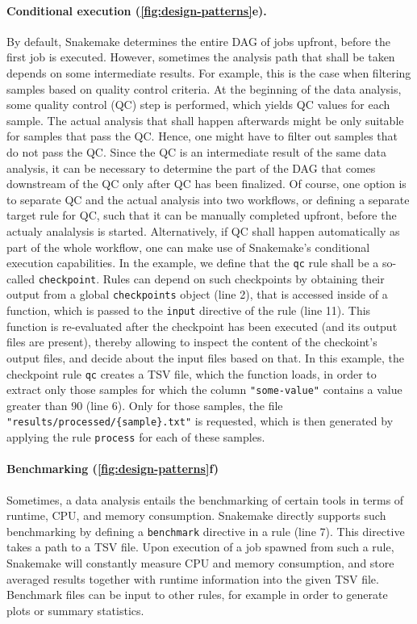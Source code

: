 \documentclass{scrartcl}
\begin{document}
\paragraph{Conditional execution (\autoref{fig:design-patterns}e).}
By default, Snakemake determines the entire DAG of jobs upfront, before the first job is executed.
However, sometimes the analysis path that shall be taken depends on some intermediate results.
For example, this is the case when filtering samples based on quality control criteria.
At the beginning of the data analysis, some quality control (QC) step is performed, which yields QC values for each sample.
The actual analysis that shall happen afterwards might be only suitable for samples that pass the QC.
Hence, one might have to filter out samples that do not pass the QC.
Since the QC is an intermediate result of the same data analysis, it can be necessary to determine the part of the DAG that comes downstream of the QC only after QC has been finalized.
Of course, one option is to separate QC and the actual analysis into two workflows, or defining a separate target rule for QC, such that it can be manually completed upfront, before the actualy analalysis is started.
Alternatively, if QC shall happen automatically as part of the whole workflow, one can make use of Snakemake's conditional execution capabilities.
In the example, we define that the \lstinline!qc! rule shall be a so-called \lstinline!checkpoint!.
Rules can depend on such checkpoints by obtaining their output from a global \lstinline!checkpoints! object (line 2), that is accessed inside of a function, which is passed to the \lstinline!input! directive of the rule (line 11).
This function is re-evaluated after the checkpoint has been executed (and its output files are present), thereby allowing to inspect the content of the checkoint's output files, and decide about the input files based on that.
In this example, the checkpoint rule \lstinline!qc! creates a TSV file, which the function loads, in order to extract only those samples for which the column \lstinline!"some-value"! contains a value greater than $90$ (line 6).
Only for those samples, the file \lstinline!"results/processed/{sample}.txt"! is requested, which is then generated by applying the rule \lstinline!process! for each of these samples.

\paragraph{Benchmarking (\autoref{fig:design-patterns}f)}
Sometimes, a data analysis entails the benchmarking of certain tools in terms of runtime, CPU, and memory consumption.
Snakemake directly supports such benchmarking by defining a \lstinline!benchmark! directive in a rule (line 7).
This directive takes a path to a TSV file.
Upon execution of a job spawned from such a rule, Snakemake will constantly measure CPU and memory consumption, and store averaged results together with runtime information into the given TSV file.
Benchmark files can be input to other rules, for example in order to generate plots or summary statistics.

\printbibliography
\end{document}

